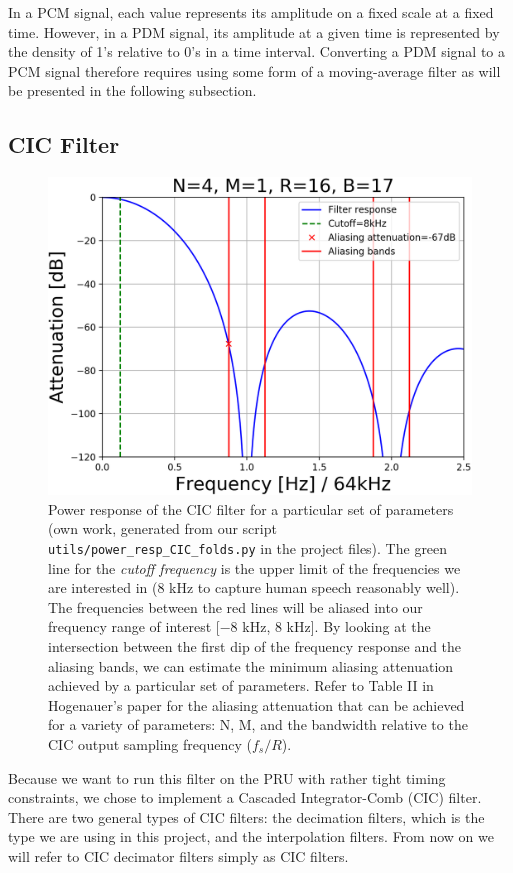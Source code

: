 \documentclass[]{report}
\begin{document}
In a PCM signal, each value represents its amplitude on a fixed scale at a fixed time. However, in a PDM signal, its amplitude at a given time is represented by the density of 1's relative to 0's in a time interval. Converting a PDM signal to a PCM signal therefore requires using some form of a moving-average filter as will be presented in the following subsection.

\hypertarget{cic-filter}{%
\subsection{CIC Filter}\label{cic-filter}}

\begin{figure}[!b]
	\centering
	\includegraphics[width=0.75\linewidth]{Pictures/CIC_power_resp.png}
	\caption{Power response of the CIC filter for a particular set of parameters (own work, generated from our script \texttt{utils/power\_resp\_CIC\_folds.py} in the project files). The green line for the \emph{cutoff frequency} is the upper limit of the frequencies we are interested in (8 kHz to capture human speech reasonably well). The frequencies between the red lines will be aliased into our frequency range of interest [$ -8 $ kHz, 8 kHz]. By looking at the intersection between the first dip of the frequency response and the aliasing bands, we can estimate the minimum aliasing attenuation achieved by a particular set of parameters. Refer to Table II in Hogenauer's paper for the aliasing attenuation that can be achieved for a variety of parameters: N, M, and the bandwidth relative to the CIC output sampling frequency ($ f_s / R $).}
	\label{fig:frequency-response}
\end{figure}

Because we want to run this filter on the PRU with rather tight timing constraints, we chose to implement a Cascaded Integrator-Comb (CIC) filter. There are two general types of CIC filters: the decimation filters, which is the type we are using in this project, and the interpolation filters. From now on we will refer to CIC decimator filters simply as CIC filters.
\end{document}
